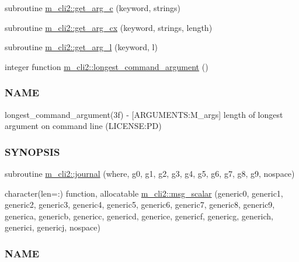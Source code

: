 \begin{DoxyCompactItemize}
subroutine \mbox{\hyperlink{namespacem__cli2_a2809fae3588cb1e09efa1985a6e5d4a7}{m\+\_\+cli2\+::get\+\_\+arg\+\_\+c}} (keyword, strings)
\item 
subroutine \mbox{\hyperlink{namespacem__cli2_a9848bf0f579798f69fd83737e118d5cb}{m\+\_\+cli2\+::get\+\_\+arg\+\_\+cx}} (keyword, strings, length)
\item 
subroutine \mbox{\hyperlink{namespacem__cli2_a8a0f18494b4ec5158935fefff5ea9491}{m\+\_\+cli2\+::get\+\_\+arg\+\_\+l}} (keyword, l)
\item 
integer function \mbox{\hyperlink{namespacem__cli2_a7240f12031027172b87fde623bd77958}{m\+\_\+cli2\+::longest\+\_\+command\+\_\+argument}} ()
\begin{DoxyCompactList}\small\item\em \subsubsection*{N\+A\+ME}

longest\+\_\+command\+\_\+argument(3f) -\/ \mbox{[}A\+R\+G\+U\+M\+E\+N\+TS\+:M\+\_\+args\mbox{]} length of longest argument on command line (L\+I\+C\+E\+N\+SE\+:PD) \subsubsection*{S\+Y\+N\+O\+P\+S\+IS}\end{DoxyCompactList}\item 
subroutine \mbox{\hyperlink{namespacem__cli2_a60a4588aa350fd58640b11f049915111}{m\+\_\+cli2\+::journal}} (where, g0, g1, g2, g3, g4, g5, g6, g7, g8, g9, nospace)
\item 
character(len=\+:) function, allocatable \mbox{\hyperlink{namespacem__cli2_a737dc863a63dc101338840baad1cfd17}{m\+\_\+cli2\+::msg\+\_\+scalar}} (generic0, generic1, generic2, generic3, generic4, generic5, generic6, generic7, generic8, generic9, generica, genericb, genericc, genericd, generice, genericf, genericg, generich, generici, genericj, nospace)
\begin{DoxyCompactList}\small\item\em \subsubsection*{N\+A\+ME}


\end{DoxyCompactList}
\end{DoxyCompactItemize}
